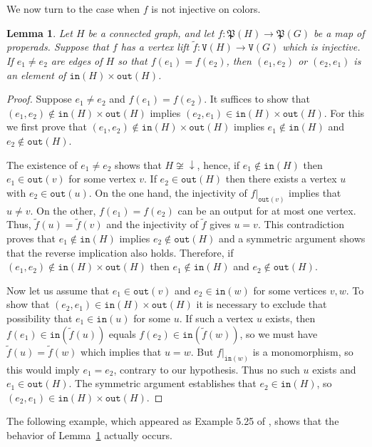 \documentclass{amsart}
\numberwithin{theorem}{subsection}
\newtheorem{lemma}[theorem]{Lemma}
\theoremstyle{definition}
\newcommand{\out}{\mathtt{out}}
\newcommand{\inp}{\mathtt{in}}
\newcommand{\vertex}{\mathtt{V}}
\begin{document}
We now turn to the case when $f$ is not injective on colors.

\begin{lemma}\label{lemma mix up each ways}
Let $H$ be a connected graph, and let $f  : \mathfrak{P}(H) \to \mathfrak{P}(G)$ be a map of properads.
Suppose that $f$ has a vertex lift $\widetilde f : \vertex(H) \to \vertex(G)$ which is injective.
If $e_1 \neq e_2$ are edges of $H$ so that $f(e_1) = f(e_2)$, then $(e_1,e_2)$ or $(e_2,e_1)$ is an element of $\inp(H) \times \out(H)$.
\end{lemma}
\begin{proof}
Suppose $e_1 \neq e_2$ and $f(e_1) = f(e_2)$.
It suffices to show that $(e_1,e_2)\notin \inp(H) \times \out(H)$ implies $(e_2,e_1)\in \inp(H) \times \out(H)$. 
For this we first prove that $(e_1,e_2)\notin \inp(H) \times \out(H)$ implies $e_1\notin \inp(H) $ and $e_2\notin \out(H)$. 

The existence of $e_1 \neq e_2$ shows that $H\not\cong {\downarrow}$, hence, if $e_1 \notin \inp(H)$ then $e_1 \in \out(v)$ for some vertex $v$.
If $e_2 \in \out(H)$ then there exists a vertex $u$ with $e_2 \in \out(u)$.
On the one hand, the injectivity of $f|_{\out(v)}$ implies that $u \neq v$.
On the other, $f(e_1) = f(e_2)$ can be an output for at most one vertex. 
Thus, $\widetilde f(u) = \widetilde f(v)$ and the injectivity of $\widetilde f$ gives $u = v$.
This contradiction proves that $e_1 \notin \inp(H)$ implies $e_2 \notin \out(H)$ and a symmetric argument shows that the reverse implication also holds. 
Therefore, if $(e_1,e_2)\notin \inp(H) \times \out(H)$ then $e_1\notin \inp(H) $ and $e_2\notin \out(H)$. 

Now let us assume that $e_1 \in \out(v)$ and $e_2 \in \inp(w)$ for some vertices $v, w$. 
To show that $(e_2, e_1) \in \inp(H) \times \out(H)$ it is necessary to exclude that possibility that $e_1 \in \inp(u)$ for some $u$. 
If such a vertex $u$ exists, then $f(e_1) \in \inp(\widetilde f(u))$ equals $f(e_2) \in \inp(\widetilde f(w))$, so we must have $\widetilde f(u) = \widetilde f(w)$ which implies that $u=w$.
But $f|_{\inp(w)}$ is a monomorphism, so this would imply $e_1 = e_2$, contrary to our hypothesis.
Thus no such $u$ exists and $e_1 \in \out(H)$.
The symmetric argument establishes that $e_2 \in \inp(H)$, so $(e_2, e_1) \in \inp(H) \times \out(H)$.
\end{proof}

The following example, which appeared as Example 5.25 of \cite{hrybook}, shows that the behavior of Lemma~\ref{lemma mix up each ways} actually occurs.
\end{document}
